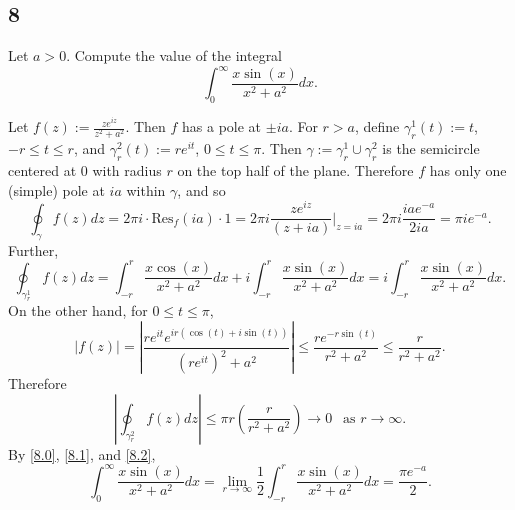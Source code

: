 \documentclass[12pt]{article}
\begin{document}
\subsection*{8}
\begin{tcolorbox}
Let $a > 0$. Compute the value of the integral
\[ \int_{0}^{\infty}\frac{x\sin(x)}{x^2 + a^2}dx. \]
\end{tcolorbox}
Let $f(z) := \frac{ze^{iz}}{z^{2} + a^{2}}$. Then $f$ has a pole at $\pm ia$. For $r > a$, define $\gamma_{r}^{1}(t) := t$, $-r \leq t \leq r$, and
$\gamma_{r}^{2}(t) := re^{it}$, $0 \leq t \leq \pi$. Then $\gamma := \gamma_{r}^{1} \cup \gamma_{r}^{2}$ is the semicircle centered at 0 with radius
$r$ on the top half of the plane. Therefore $f$ has only one (simple) pole at $ia$ within $\gamma$, and so
\begin{equation}
\oint_{\gamma}f(z)dz = 2\pi i \cdot \text{Res}_{f}(ia)\cdot 1 = 2\pi i \frac{ze^{iz}}{(z + ia)}\bigg|_{z=ia} = 2\pi i\frac{ia e^{-a}}{2ia} = \pi i
e^{-a}.
\label{8.0}
\end{equation}
Further,
\begin{equation}
\oint_{\gamma_{r}^{1}}f(z)dz = \int_{-r}^{r}\frac{x\cos(x)}{x^{2} + a^{2}}dx + i \int_{-r}^{r}\frac{x\sin(x)}{x^{2} + a^{2}}dx =
i\int_{-r}^{r}\frac{x\sin(x)}{x^{2} + a^{2}}dx.
\label{8.1}
\end{equation}
On the other hand, for $0 \leq t \leq \pi$,
\[ |f(z)| = \left|\frac{re^{it}e^{ir(\cos(t) + i\sin(t))}}{(re^{it})^{2} + a^{2}}\right| \leq \frac{re^{-r\sin(t)}}{r^{2} + a^{2}} \leq \frac{r}{r^{2}
+ a^{2}}. \]
Therefore
\begin{equation}
\left| \oint_{\gamma_{r}^{2}}f(z)dz \right| \leq \pi r\left( \frac{r}{r^{2} + a^{2}} \right) \rightarrow 0 \ \ \text{ as } r\rightarrow \infty.
\label{8.2}
\end{equation}
By \eqref{8.0}, \eqref{8.1}, and \eqref{8.2},
\[ \int_{0}^{\infty}\frac{x\sin(x)}{x^{2} + a^{2}}dx = \lim_{r\rightarrow\infty}\frac{1}{2}\int_{-r}^{r}\frac{x\sin(x)}{x^{2} + a^{2}}dx = \frac{\pi
e^{-a}}{2}. \]

\newpage
\end{document}
